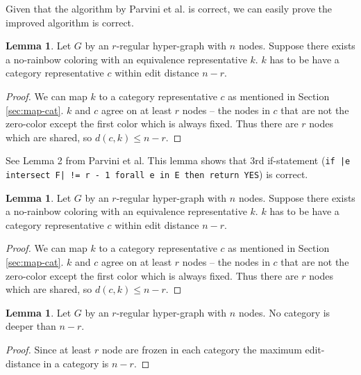 \documentclass{book}
\theoremstyle{definition}
\newtheorem{lemma}[theorem]{Lemma}
\begin{document}
Given that the algorithm by Parvini et al. is correct, we can easily prove the improved algorithm is correct.

\begin{lemma}
  Let $G$ by an $r$-regular hyper-graph with $n$ nodes. Suppose there exists a no-rainbow coloring with an equivalence representative $k$. $k$ has to be have a category representative $c$ within edit distance $n - r$.
\end{lemma}
\begin{proof}
  We can map $k$ to a category representative $c$ as mentioned in Section \ref{sec:map-cat}. $k$ and $c$ agree on at least $r$ nodes -- the nodes in $c$ that are not the zero-color except the first color which is always fixed. Thus there are $r$ nodes which are shared, so $d(c, k) \le n - r$.
\end{proof}

See Lemma 2 from Parvini et al. This lemma shows that 3rd if-statement (\texttt{if |e intersect F| != r - 1 forall e in E then return YES}) is correct.

\begin{lemma}
  Let $G$ by an $r$-regular hyper-graph with $n$ nodes. Suppose there exists a no-rainbow coloring with an equivalence representative $k$. $k$ has to be have a category representative $c$ within edit distance $n - r$.
\end{lemma}
\begin{proof}
  We can map $k$ to a category representative $c$ as mentioned in Section \ref{sec:map-cat}. $k$ and $c$ agree on at least $r$ nodes -- the nodes in $c$ that are not the zero-color except the first color which is always fixed. Thus there are $r$ nodes which are shared, so $d(c, k) \le n - r$.
\end{proof}

% 

\begin{lemma}
  Let $G$ by an $r$-regular hyper-graph with $n$ nodes. No category is deeper than $n - r$.
\end{lemma}
\begin{proof}
  Since at least $r$ node are frozen in each category the maximum edit-distance in a category is $n - r$.
\end{proof}
\end{document}
